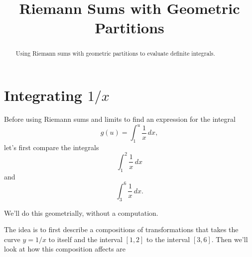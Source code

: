 \documentclass{ximera}
\title{Riemann Sums with Geometric Partitions}
\begin{document}
\begin{abstract}
Using Riemann sums with geometric partitions to evaluate definite integrals.
\end{abstract}
\maketitle



\section{Integrating $1/x$}

Before using Riemann sums and limits to find an expression for the integral
\[
    g(u) = \int_1^u \frac{1}{x}\, dx ,
\]
let's first compare the integrals %
\begin{equation}
      \int_1^2 \frac{1}{x}\, dx  \label{EqIntegral1}
\end{equation}
and 
\begin{equation}
      \int_3^6 \frac{1}{x}\, dx.   \label{EqIntegral2}
\end{equation}

We'll do this geometrially, without a computation.

The idea is to first describe a compositions of transformations that takes the curve $y=1/x$ to itself and the interval $[1,2]$ to the interval $[3,6]$. Then we'll look at how this composition affects are
\end{document}

